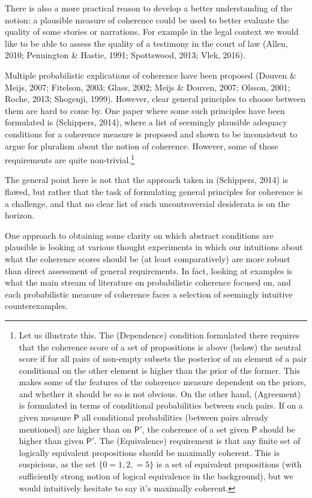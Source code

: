 \documentclass[
  10pt,
]{scrartcl}
\begin{document}
There is also a more practical reason to develop a better understanding of the notion: a plausible measure of coherence could be used to better evaluate the quality of some stories or narrations. For example in the legal context we would like to be able to assess the quality of a testimony in the court of law (Allen, 2010; Pennington \& Hastie, 1991; Spottswood, 2013; Vlek, 2016).

Multiple probabilistic explications of coherence have been proposed
(Douven \& Meijs, 2007; Fitelson, 2003; Glass, 2002; Meijs \& Douven, 2007; Olsson, 2001; Roche, 2013; Shogenji, 1999). However, clear general principles to choose between them are hard to come by. One paper where some such principles have been formulated is (Schippers, 2014), where a list of seemingly plausible adequacy conditions for a coherence measure is proposed and shown to be inconsistent to argue for pluralism about the notion of coherence. However, some of those requirements are quite non-trivial.\footnote{Let us illustrate this. The (Dependence) condition formulated there requires that the coherence score of a set of propositions is above (below) the neutral score if for all pairs of non-empty subsets the posterior of an element of a pair conditional on the other element is higher than the prior of the former. This makes some of the features of the coherence measure dependent on the priors, and whether it should be so is not obvious. On the other hand, (Agreement) is formulated in terms of conditional probabilities between such pairs. If on a given measure \(\mathsf{P}\) all conditional probabilities (between pairs already mentioned) are higher than on \(\mathsf{P}'\), the coherence of a set given \(\mathsf{P}\) should be higher than given \(\mathsf{P}'\). The (Equivalence) requirement is that any finite set of logically equivalent propositions should be maximally coherent. This is suspicious, as the set \(\{ 0= 1, 2, = 5\}\) is a set of equivalent propositions (with sufficiently strong notion of logical equivalence in the background), but we would intuitively hesitate to say it's maximally coherent.}

The general point here is not that the approach taken in (Schippers, 2014) is flawed, but rather that the task of formulating general principles for coherence is a challenge, and that no clear list of such uncontroversial desiderata is on the horizon.

One approach to obtaining some clarity on which abstract conditions are plausible is looking at various thought experiments in which our intuitions about what the coherence scores should be (at least comparatively) are more robust than direct assessment of general requirements. In fact, looking at examples is what the main stream of literature on probabilistic coherence focused on, and each probabilistic measure of coherence faces a selection of seemingly intuitive counterexamples.
\end{document}
